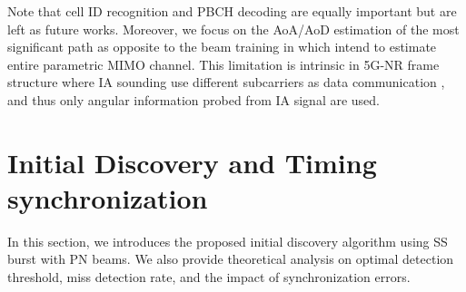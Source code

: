 \documentclass[journal]{IEEEtran}
\newcommand{\hermitian}[0]{\text{H}}
\newcommand{\CFO}[0]{\epsilon_{\text{F}}}
\begin{document}
Note that cell ID recognition and PBCH decoding are equally important but are left as future works. \color{black} Moreover, we focus on the AoA/AoD estimation of the most significant path as opposite to the beam training in \cite{8306126,8323164} which intend to estimate entire parametric MIMO channel. This limitation is intrinsic in 5G-NR frame structure where IA sounding use different subcarriers as data communication \cite{Giordani_beam_turotial_arxiv_1804}, and thus only angular information probed from IA signal are used. 

% 
%
\section{Initial Discovery and Timing synchronization}
\label{sec:cell_discovery}
In this section, we introduces the proposed initial discovery algorithm using SS burst with PN beams. We also provide theoretical analysis on optimal detection threshold, miss detection rate, and the impact of synchronization errors. 
\end{document}
